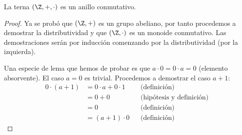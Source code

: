 \documentclass[11pt,oneside,a4paper]{book}
\begin{document}
\begin{thm}
La terna $(\Z,+,\cdot)$ es un anillo conmutativo.
\end{thm}
\begin{proof}
Ya se probó que $(\Z,+)$ es un grupo abeliano, por tanto procedemos a demostrar la distributividad y que $(\Z,\cdot)$ es un monoide conmutativo. Las demostraciones serán por inducción comenzando por la distributividad (por la izquierda).

Una especie de lema que hemos de probar es que $a\cdot 0=0\cdot a=0$ (elemento absorvente). El caso $a=0$ es trivial. Procedemos a demostrar el caso $a+1$:
$$\begin{aligned}
0\cdot(a+1)&=0\cdot a+0\cdot 1 &&\text{(definición)}\\
&=0+0 &&\text{(hipótesis y definición)}\\
&=0 &&\text{(definición)}\\
&=(a+1)\cdot 0 &&\text{(definición)}
\end{aligned}$$


\end{proof}
\end{document}
